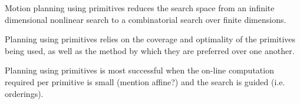 Motion planning using primitives reduces the search space from an infinite dimensional nonlinear search to a combinatorial search over finite dimensions.

Planning using primitives relies on the coverage and optimality of the primitives being used, as well as the method by which they are preferred over one another.


Planning using primitives is most successful when the on-line computation required per primitive is small (mention affine?) and the search is guided (i.e. orderings).